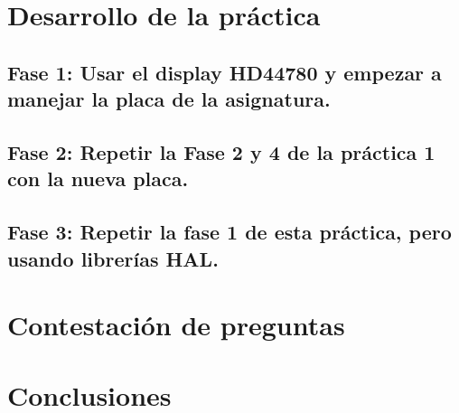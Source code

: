 \documentclass[11pt,a4paper]{article}
\begin{document}
	\section{Desarrollo de la práctica}
	\subsection{Fase 1: Usar el display HD44780 y empezar a manejar la placa de la asignatura.}
	
	
	\subsection{Fase 2: Repetir la Fase 2 y 4 de la práctica 1 con la nueva placa.}
	
	\subsection{Fase 3: Repetir la fase 1 de esta práctica, pero usando librerías HAL.}

	\section{Contestación de preguntas}
	
	\section{Conclusiones}
\end{document}
